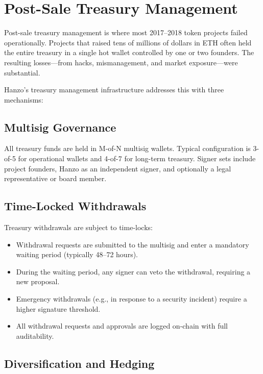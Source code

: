 \documentclass[11pt,letterpaper]{article}
\begin{document}
\section{Post-Sale Treasury Management}
\label{sec:treasury}

Post-sale treasury management is where most 2017--2018 token projects failed
operationally. Projects that raised tens of millions of dollars in ETH often
held the entire treasury in a single hot wallet controlled by one or two
founders. The resulting losses---from hacks, mismanagement, and market
exposure---were substantial.

Hanzo's treasury management infrastructure addresses this with three mechanisms:

\subsection{Multisig Governance}

All treasury funds are held in M-of-N multisig wallets. Typical configuration
is 3-of-5 for operational wallets and 4-of-7 for long-term treasury. Signer
sets include project founders, Hanzo as an independent signer, and optionally
a legal representative or board member.

\subsection{Time-Locked Withdrawals}

Treasury withdrawals are subject to time-locks:

\begin{itemize}[leftmargin=1.2em]
    \item Withdrawal requests are submitted to the multisig and enter a
    mandatory waiting period (typically 48--72 hours).
    \item During the waiting period, any signer can veto the withdrawal,
    requiring a new proposal.
    \item Emergency withdrawals (e.g., in response to a security incident)
    require a higher signature threshold.
    \item All withdrawal requests and approvals are logged on-chain with
    full auditability.
\end{itemize}

\subsection{Diversification and Hedging}
\end{document}
